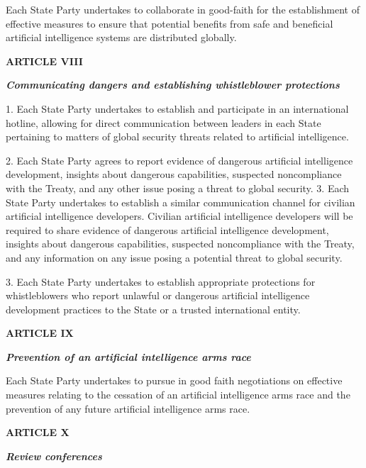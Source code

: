 \documentclass[12pt,a4paper]{article}
\begin{document}
Each State Party undertakes to collaborate in good-faith for the establishment of effective measures to ensure that potential benefits from safe and beneficial artificial intelligence systems are distributed globally. 

\begin{center}
    
\textbf{{ARTICLE VIII}}

\textit{\textbf{Communicating dangers and establishing whistleblower protections}} 
\end{center}
1. Each State Party undertakes to establish and participate in an international hotline, allowing for direct communication between leaders in each State pertaining to matters of global security threats related to artificial intelligence. 

2. Each State Party agrees to report evidence of dangerous artificial intelligence development, insights about dangerous capabilities, suspected noncompliance with the Treaty, and any other issue posing a threat to global security. 
3. Each State Party undertakes to establish a similar communication channel for civilian artificial intelligence developers. Civilian artificial intelligence developers will be required to share evidence of dangerous artificial intelligence development, insights about dangerous capabilities, suspected noncompliance with the Treaty, and any information on any issue posing a potential threat to global security.

3. Each State Party undertakes to establish appropriate protections for whistleblowers who report unlawful or dangerous artificial intelligence development practices to the State or a trusted international entity. 

 \begin{center}
    
\textbf{{ARTICLE IX}}

\textbf{\textit{Prevention of an artificial intelligence arms race}}
\end{center}

Each State Party undertakes to pursue in good faith negotiations on effective measures relating to the cessation of an artificial intelligence arms race and the prevention of any future artificial intelligence arms race. 
    
 \begin{center}
    
\textbf{{ARTICLE X}}

\textbf{\textit{Review conferences}}
\end{center}
\end{document}
